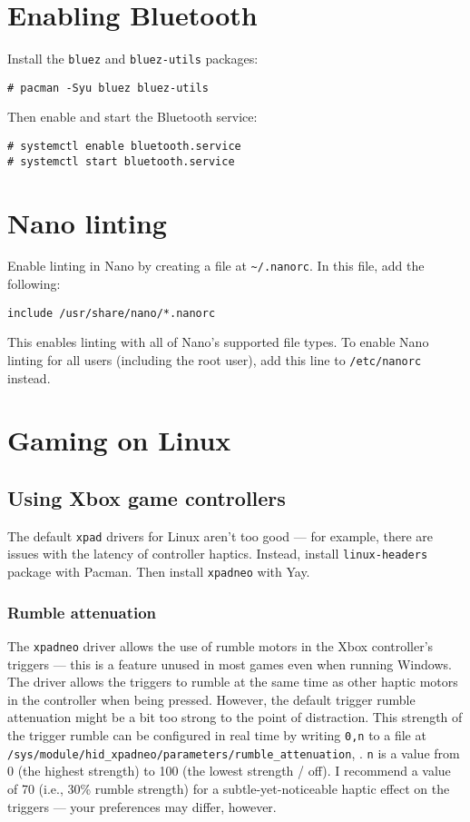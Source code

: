 \documentclass[a4paper]{article}
\begin{document}
\section{Enabling Bluetooth}

Install the \lstinline|bluez| and \lstinline|bluez-utils| packages:
\begin{lstlisting}
# pacman -Syu bluez bluez-utils
\end{lstlisting}

Then enable and start the Bluetooth service:
\begin{lstlisting}
# systemctl enable bluetooth.service
# systemctl start bluetooth.service
\end{lstlisting}

\section{Nano linting}

Enable linting in Nano by creating a file at \lstinline|~/.nanorc|.
In this file, add the following:
\begin{lstlisting}
include /usr/share/nano/*.nanorc
\end{lstlisting}
This enables linting with all of Nano's supported file types.
To enable Nano linting for all users (including the root user), add this line to \lstinline|/etc/nanorc| instead.

\section{Gaming on Linux}

\subsection{Using Xbox game controllers}

The default \lstinline|xpad| drivers for Linux aren't too good --- for example, there are issues with the latency of controller haptics.
Instead, install \lstinline|linux-headers| package with Pacman.
Then install \lstinline|xpadneo| with Yay.

\subsubsection{Rumble attenuation}

The \lstinline|xpadneo| driver allows the use of rumble motors in the Xbox controller's triggers --- this is a feature unused in most games even when running Windows.
The driver allows the triggers to rumble at the same time as other haptic motors in the controller when being pressed.
However, the default trigger rumble attenuation might be a bit too strong to the point of distraction.
This strength of the trigger rumble can be configured in real time by writing \lstinline|0,n| to a file at \lstinline|/sys/module/hid_xpadneo/parameters/rumble_attenuation|, \cite{xpadneo-troubleshooting}.
\lstinline|n| is a value from 0 (the highest strength) to 100 (the lowest strength / off).
I recommend a value of 70 (i.e., 30\% rumble strength) for a subtle-yet-noticeable haptic effect on the triggers --- your preferences may differ, however.
\end{document}
